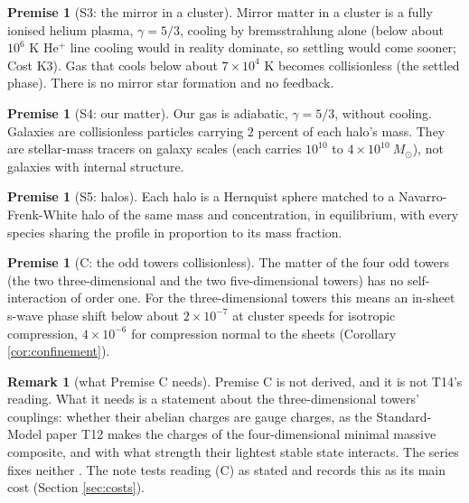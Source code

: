 \documentclass[11pt]{article}
\theoremstyle{definition}
\newtheorem{remark}[theorem]{Remark}
\newtheorem{premise}[theorem]{Premise}
\newcommand{\Msun}{M_{\odot}}
\begin{document}
\begin{premise}[S3: the mirror in a cluster]\label{prem:S3}
Mirror matter in a cluster is a fully ionised helium plasma, $\gamma = 5/3$, cooling by bremsstrahlung alone (below about $10^{6}$ K He$^{+}$ line cooling would in reality dominate, so settling would come sooner; Cost K3). Gas that cools below about $7 \times 10^{4}$ K becomes collisionless (the settled phase). There is no mirror star formation and no feedback.
\end{premise}

\begin{premise}[S4: our matter]\label{prem:S4}
Our gas is adiabatic, $\gamma = 5/3$, without cooling. Galaxies are collisionless particles carrying $2$ percent of each halo's mass. They are stellar-mass tracers on galaxy scales (each carries $10^{10}$ to $4 \times 10^{10}\ \Msun$), not galaxies with internal structure.
\end{premise}

\begin{premise}[S5: halos]\label{prem:S5}
Each halo is a Hernquist sphere matched to a Navarro-Frenk-White halo of the same mass and concentration, in equilibrium, with every species sharing the profile in proportion to its mass fraction.
\end{premise}

\begin{premise}[C: the odd towers collisionless]\label{prem:C}
The matter of the four odd towers (the two three-dimensional and the two five-dimensional towers) has no self-interaction of order one. For the three-dimensional towers this means an in-sheet s-wave phase shift below about $2 \times 10^{-7}$ at cluster speeds for isotropic compression, $4 \times 10^{-6}$ for compression normal to the sheets (Corollary \ref{cor:confinement}).
\end{premise}

\begin{remark}[what Premise C needs]\label{rem:Cneeds}
Premise C is not derived, and it is not T14's reading. What it needs is a statement about the three-dimensional towers' couplings: whether their abelian charges are gauge charges, as the Standard-Model paper T12 \cite{ButlerT12} makes the charges of the four-dimensional minimal massive composite, and with what strength their lightest stable state interacts. The series fixes neither \cite[Prop.~A.4]{ButlerT14}. The note tests reading (C) as stated and records this as its main cost (Section \ref{sec:costs}).
\end{remark}
\end{document}
